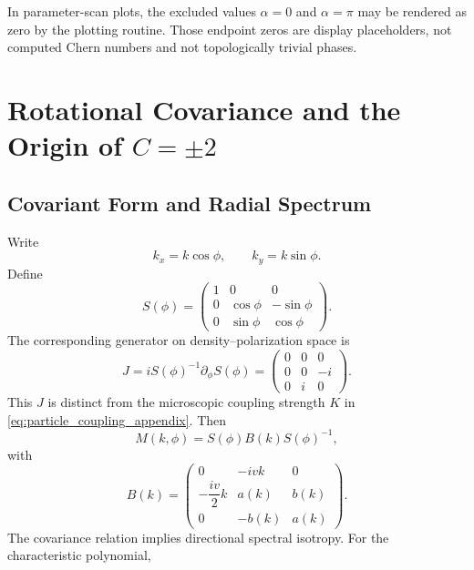 \documentclass[11pt]{article}
\numberwithin{equation}{section}
\begin{document}
In parameter-scan plots, the excluded values $\alpha=0$ and $\alpha=\pi$
may be rendered as zero by the plotting routine. Those endpoint zeros are
display placeholders, not computed Chern numbers and not topologically
trivial phases.

\section{Rotational Covariance and the Origin of \texorpdfstring{$C=\pm2$}{C = +/-2}}

\subsection{Covariant Form and Radial Spectrum}

Write
\begin{equation}
  k_x=k\cos\phi,\qquad k_y=k\sin\phi.
\end{equation}
Define
\begin{equation}
  S(\phi)=
  \begin{pmatrix}
  1&0&0\\
  0&\cos\phi&-\sin\phi\\
  0&\sin\phi&\cos\phi
  \end{pmatrix}.
\end{equation}
The corresponding generator on density--polarization space is
\begin{equation}
  J=iS(\phi)^{-1}\partial_\phi S(\phi)=
  \begin{pmatrix}
  0&0&0\\
  0&0&-i\\
  0&i&0
  \end{pmatrix}.
  \label{eq:angular_generator}
\end{equation}
This $J$ is distinct from the microscopic coupling strength $K$ in
\eqref{eq:particle_coupling_appendix}.
Then
\begin{equation}
  M(k,\phi)=S(\phi)B(k)S(\phi)^{-1},
  \label{eq:rotational_covariance}
\end{equation}
with
\begin{equation}
  B(k)=
  \begin{pmatrix}
  0&-ivk&0\\[4pt]
  -\dfrac{iv}{2}k&a(k)&b(k)\\[4pt]
  0&-b(k)&a(k)
  \end{pmatrix}.
  \label{eq:radial_matrix}
\end{equation}
The covariance relation implies directional spectral isotropy. For the
characteristic polynomial,
\end{document}
